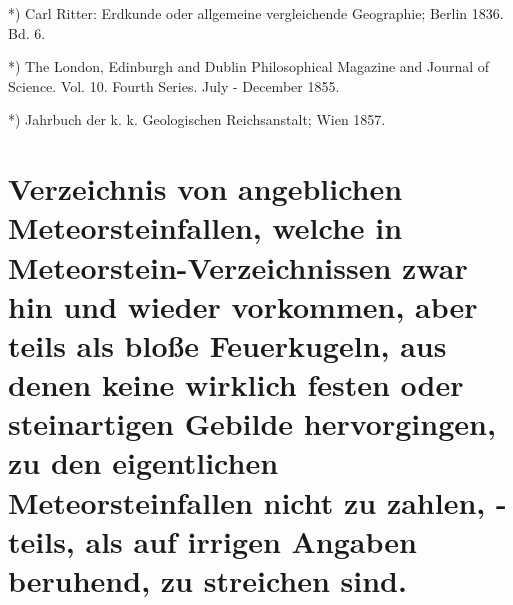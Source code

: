 \documentclass[a4paper, 8pt, oneside, polutonikogreek, german]{article}
\begin{document}
*) Carl Ritter: Erdkunde oder allgemeine vergleichende Geographie; Berlin 1836. Bd. 6.

*) The London, Edinburgh and Dublin Philosophical Magazine and Journal of Science. Vol. 10. Fourth Series. July - December 1855.

*) Jahrbuch der k. k. Geologischen Reichsanstalt; Wien 1857.
\clearpage
\section{Verzeichnis von angeblichen Meteorsteinfallen, welche in Meteorstein-Verzeichnissen zwar hin und wieder vorkommen, aber teils als bloße Feuerkugeln, aus denen keine wirklich festen oder steinartigen Gebilde hervorgingen, zu den eigentlichen Meteorsteinfallen nicht zu zahlen, - teils, als auf irrigen Angaben beruhend, zu streichen sind.}
\end{document}
